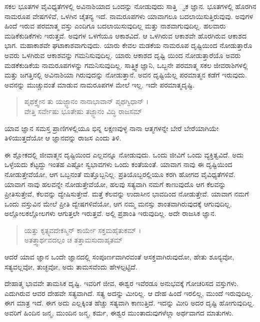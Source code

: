 ಸಕಲ ಭೂತಗಳ ವೈವಿಧ್ಯತೆಗಳಲ್ಲಿ ಅವಿನಾಶಿಯಾದ ಒಂದನ್ನು ನೋಡುವುದು ಸಾತ್ತಿ ್ವಕ ಜ್ಞಾನ. ಭೂತಗಳಲ್ಲಿ ಹೊರಗಿನ ನಾಮರೂಪ ವೇಷಗಳಿವೆ, ಒಳಗಿನ ಚೈತನ್ಯ ಇದೆ. ನಾಮರೂಪಗಳು ಯಾವಾಗಲೂ ಬದಲಾಯಿಸುತ್ತಿರುವುವು. ಅವುಗಳ ಹಿಂದೆ ಇರುವ ಪರಮಾತ್ಮ ವಸ್ತು ಎಂದಿಗೂ ಬದಲಾಯಿಸುವುದಿಲ್ಲ ಮತ್ತು ನಾಶವಾಗುವುದಿಲ್ಲ. ಹಲವಾರು ಮಡಿಕೆಕುಡಿಕೆಗಳು ಇರುತ್ತವೆ. ಅವುಗಳ ಒಳಗೆಯೂ ಆಕಾಶವಿದೆ. ಆ ಒಳಗಿರುವ ಆಕಾಶವೇ ಹೊರಗಿರುವ ಆಕಾಶದ ಭಾಗ. ಮಹಾಕಾಶವೇ ಘಟಾಕಾಶವಾಗುವುದು. ಯಾರು ಕೇವಲ ಮಡಕೆಯ ನಾಮರೂಪ ದೃಷ್ಟಿಯಿಂದ ನೋಡುತ್ತಾರೊ ಅವರು ಒಳಗಿರುವ ಆಕಾಶವನ್ನು ಗಮನಿಸುವುದಿಲ್ಲ. ಯಾರು ಆಕಾಶದ ದೃಷ್ಟಿ ಯಿಂದ ನೋಡುತ್ತಾರೆಯೊ ಅವರು ಮಡಕೆಕುಡಿಕೆಯ ನಾಮರೂಪಗಳನ್ನು ಗಮನಿಸುವುದಿಲ್ಲ. ಸಾತ್ತ್ವಿಕ ಜ್ಞಾನಿ, ಒಬ್ಬನೇ ಪರಮಾತ್ಮ ಸಕಲ ಜೀವರಾಶಿಗಳಲ್ಲಿ ಮತ್ತು ಜಗತ್ತಿನಲ್ಲಿ ಅವಿನಾಶಿಯಾ ಗಿರುವುದನ್ನು ನೋಡುತ್ತಾನೆ. ಅವನ ದೃಷ್ಟಿಯೆಲ್ಲ ಪರಮಾತ್ಮನ ಕಡೆಗೆ ಇರುವುದು. ಅವನನ್ನು ಮುಚ್ಚುವಂತೆ ಮಾಡುವ ನಾಮರೂಪಗಳ ಮೇಲೆ ಇಲ್ಲ. ಇದೇ ಪರಮಾತ್ಮದೃಷ್ಟಿ.

\begin{verse}
ಪೃಥಕ್ತ್ವೇನ ತು ಯಜ್ಜ್ಞಾನಂ ನಾನಾಭಾವಾನ್ ಪೃಥಗ್ವಿಧಾನ್ ।\\ವೇತ್ತಿ ಸರ್ವೇಷು ಭೂತೇಷು ತಜ್ಜ್ಞಾನಂ ವಿದ್ಧಿ ರಾಜಸಮ್ 
\end{verse}

{\small ಯಾವ ಜ್ಞಾನ ಸಮಸ್ತ ಪ್ರಾಣಿಗಳಲ್ಲಿಯೂ ಭಿನ್ನ ಲಕ್ಷಣವುಳ್ಳ ನಾನಾ ಆತ್ಮಗಳನ್ನೇ ಬೇರೆ ಬೇರೆಯಾಗಿಯೇ ತಿಳಿಯುತ್ತದೆಯೋ ಆ ಜ್ಞಾನವನ್ನು ರಾಜಸ ಎಂದು ತಿಳಿ.}

ಈ ಶ್ಲೋಕದಲ್ಲಿ ಜೀವಾತ್ಮನ ದೃಷ್ಟಿಯಿಂದ ಎಲ್ಲವನ್ನೂ ನೋಡುವುದು. ಒಂದು ಜೀವಿಗೆ ಒಂದು ವ್ಯಕ್ತಿತ್ವವಿದೆ. ಅದು ಒಳ್ಳೆಯದು ಕೆಟ್ಟದ್ದು ಇಂತಹ ಎಷ್ಟೋ ಸ್ವಭಾವಗಳು ಒಂದು ಕಂತೆಯಂತೆ. ಯಾವಾಗ ನಾವು ಈ ದೃಷ್ಟಿಯಿಂದ ನೋಡುತ್ತೇವೆಯೋ, ಆಗ ಒಬ್ಬನಂತೆ ಮತ್ತೊಬ್ಬನಿಲ್ಲ. ಪ್ರತಿಯೊಬ್ಬರಲ್ಲಿಯೂ ಕರಗಿ ಹೋಗದ ವೈವಿಧ್ಯತೆಗಳಿವೆ. ಯಾವಾಗ ನಾವು ಹಲವನ್ನೇ ನೋಡುತ್ತೇವೆಯೋ, ಹಲವು ಸತ್ಯವಾಗಿ ನಮಗೆ ಕಾಣುವುದೊ ಆಗ ಕೆಲವನ್ನು ಪ್ರೀತಿಸುತ್ತೇವೆ, ಕೆಲವನ್ನು ದ್ವೇಷಿಸುತ್ತೇವೆ. ಮತ್ತೆ ಕೆಲವನ್ನು ಉದಾಸೀನ ಭಾವದಿಂದ ನೋಡುತ್ತೇವೆ. ಯಾವಾಗ ನಮಗೆ ಒಂದು ವಸ್ತುವಿನ ಮೇಲೆ ಪ್ರೀತಿ ದ್ವೇಷಗಳಿವೆಯೋ, ಆಗ ನಮ್ಮ ಮನಸ್ಸು ಶಾಂತವಾಗಿರುವುದಕ್ಕೆ ಆಗುವುದಿಲ್ಲ. ಅಲ್ಲೋಲಕಲ್ಲೋಲಗಳು ಆಗುತ್ತಲೇ ಇರುತ್ತವೆ. ಅಲ್ಲಿ ಪ್ರಶಾಂತಿ ಇರುವುದಿಲ್ಲ. ಅದೇ ರಾಜಸಿಕ ಜ್ಞಾನ.

\begin{verse}
ಯತ್ತು ಕೃತ್ಸ್ನವದೇಕಸ್ಮಿನ್ ಕಾರ್ಯೇ ಸಕ್ತಮಹೈತುಕಮ್ ।\\ಅತತ್ತ್ವಾರ್ಥವದಲ್ಪಂ ಚ ತತ್ತಾಮಸುದಾಹೃತಮ್ 
\end{verse}

{\small ಆದರೆ ಯಾವ ಜ್ಞಾನ ಒಂದೇ ಜ್ಞಾನದಲ್ಲಿ ಸಂಪೂರ್ಣವಾಗಿರವಂತೆ ಆಸಕ್ತವಾಗಿರುವುದೋ, ಹೇತು ಶೂನ್ಯವೋ, ಸತ್ಯವಲ್ಲವೋ, ತುಚ್ಛವೋ, ಅದು ತಾಮಸವೆಂದು ಹೇಳಲ್ಪಟ್ಟಿದೆ.}

ದೇಹಾತ್ಮ ಭಾವವೇ ತಾಮಸಿಕ ದೃಷ್ಟಿ. ಇವರಿಗೆ ಜೀವ, ಈಶ್ವರ ಇವೆರಡೂ ಅನುಭವಕ್ಕೆ ಗೋಚರಿಸದ ವಸ್ತುಗಳು. ಎದುಗಿರುವ ಆವರ ದೇಹವೇ ಸತ್ಯವಾಗಿದೆ. ಸತ್ಯ ಅದನ್ನು ಮೀರಿಲ್ಲ. ಆ ದೇಹ ಹಿಂದೆ ಇರಲಿಲ್ಲ, ಮುಂದೆ ಇರುವುದಿಲ್ಲ. ಈಗ ಮಾತ್ರ ಇದೆ. ಈಗ ಅದು ಎಲ್ಲಕ್ಕಿಂತ ಹೆಚ್ಚು ಸತ್ಯವಾಗಿ ಕಾಣುತ್ತಿದೆ. ಇದನ್ನು ಮೀರಿ ಅದರ ದೃಷ್ಟಿ ಹೋಗುವುದಿಲ್ಲ. ಅವರಿಗೆ ಹಿಂದಿನ ಜನ್ಮ, ಮುಂದಿನ ಜನ್ಮ, ಕರ್ಮ, ಈಶ್ವರ ಮುಂತಾದುವುಗಳೆಲ್ಲಾ ಅರ್ಥವಾಗದ ಮಾತುಗಳು.

